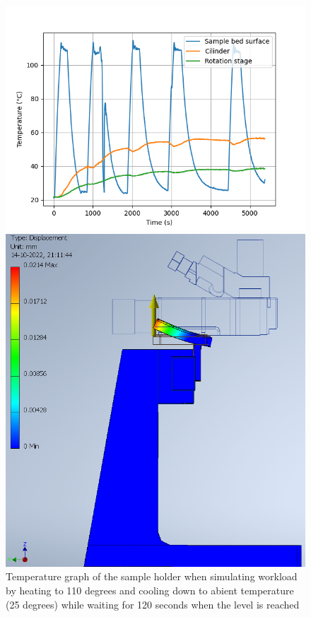 \documentclass[11pt]{article}
\begin{document}
\begin{figure}[H]
  \centering
  \begin{minipage}[b]{0.45\textwidth}
    \includegraphics[width=\textwidth]{img/sample_holder_and_mask/temp_cycling.png}
    \caption{Temperature graph of the sample holder when simulating workload by heating to 110 degrees and cooling down to abient temperature (25 degrees) while waiting for 120 seconds when the level is reached}
    \label{fig:temperature_graph}
  \end{minipage}
  \hfill
  \begin{minipage}[b]{0.45\textwidth}
    \includegraphics[width=1\textwidth]{img/rigidity_simulation/study_8.png}

\end{minipage}
\end{figure}
\end{document}

